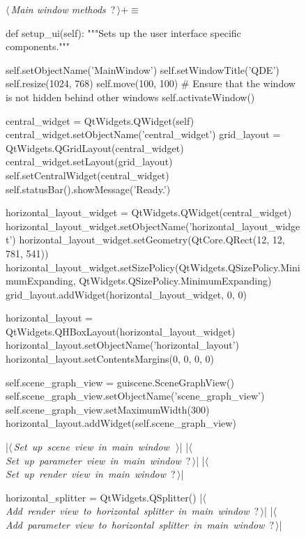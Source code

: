 \documentclass[%
    a4paper,    %
    justified,  %
    nobib,      %
    openany     %
]{tufte-book}
\begin{document}
\begin{figure}
\begin{flushleft} \small
\begin{minipage}{\linewidth}\label{scrap20}\raggedright\small
{} $\langle\,${\itshape Main window methods}\nobreak\ {\footnotesize {?}}$\,\rangle+\equiv$
\vspace{-1ex}
\begin{pythoncode}
def setup_ui(self):
    """Sets up the user interface specific components."""

    self.setObjectName('MainWindow')
    self.setWindowTitle('QDE')
    self.resize(1024, 768)
    self.move(100, 100)
    # Ensure that the window is not hidden behind other windows
    self.activateWindow()

    central_widget = QtWidgets.QWidget(self)
    central_widget.setObjectName('central_widget')
    grid_layout = QtWidgets.QGridLayout(central_widget)
    central_widget.setLayout(grid_layout)
    self.setCentralWidget(central_widget)
    self.statusBar().showMessage('Ready.')

    horizontal_layout_widget = QtWidgets.QWidget(central_widget)
    horizontal_layout_widget.setObjectName('horizontal_layout_widget')
    horizontal_layout_widget.setGeometry(QtCore.QRect(12, 12, 781, 541))
    horizontal_layout_widget.setSizePolicy(QtWidgets.QSizePolicy.MinimumExpanding,
    QtWidgets.QSizePolicy.MinimumExpanding)
    grid_layout.addWidget(horizontal_layout_widget, 0, 0)

    horizontal_layout = QtWidgets.QHBoxLayout(horizontal_layout_widget)
    horizontal_layout.setObjectName('horizontal_layout')
    horizontal_layout.setContentsMargins(0, 0, 0, 0)

    self.scene_graph_view = guiscene.SceneGraphView()
    self.scene_graph_view.setObjectName('scene_graph_view')
    self.scene_graph_view.setMaximumWidth(300)
    horizontal_layout.addWidget(self.scene_graph_view)

    |\hbox{$\langle\,${\itshape Set up scene view in main window}\nobreak\ {\footnotesize {}}$\,\rangle$}|
    |\hbox{$\langle\,${\itshape Set up parameter view in main window}\nobreak\ {\footnotesize ?}$\,\rangle$}|
    |\hbox{$\langle\,${\itshape Set up render view in main window}\nobreak\ {\footnotesize ?}$\,\rangle$}|

    horizontal_splitter = QtWidgets.QSplitter()
    |\hbox{$\langle\,${\itshape Add render view to horizontal splitter in main window}\nobreak\ {\footnotesize ?}$\,\rangle$}|
    |\hbox{$\langle\,${\itshape Add parameter view to horizontal splitter in main window}\nobreak\ {\footnotesize ?}$\,\rangle$}|


\end{pythoncode}
\end{minipage}
\end{flushleft}
\end{figure}
\end{document}
